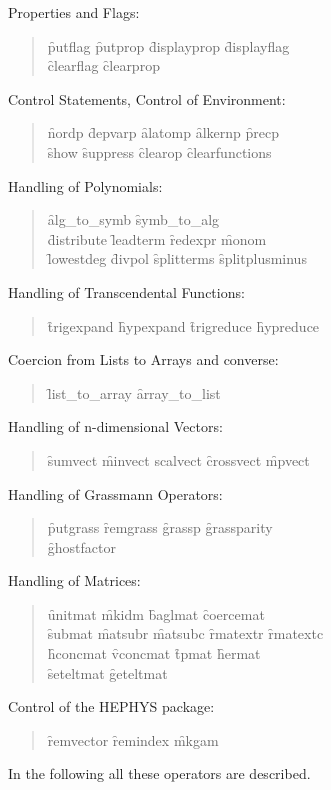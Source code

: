 \begin{itemize}
\item{Properties and Flags:}
\begin{quote}
\f{putflag} \f{putprop} \f{displayprop} \f{displayflag} \\
\f{clearflag} \f{clearprop} 
\end{quote}
\item{Control Statements, Control of Environment:}
\begin{quote}
\f{nordp} \f{depvarp} \f{alatomp} \f{alkernp} \f{precp} \\
\f{show} \f{suppress} \f{clearop} \f{clearfunctions}
\end{quote}
\item{Handling of Polynomials:}
\begin{quote}
\f{alg\_to\_symb} \f{symb\_to\_alg} \\
\f{distribute} \f{leadterm} \f{redexpr} \f{monom} \\
\f{lowestdeg} \f{divpol} \f{splitterms} \f{splitplusminus}
\end{quote}
\item{Handling of Transcendental Functions:}
\begin{quote}
\f{trigexpand} \f{hypexpand} \f{trigreduce} \f{hypreduce}
\end{quote}
\item{Coercion from Lists to Arrays and converse:}
\begin{quote}
\f{list\_to\_array} \f{array\_to\_list}
\end{quote}
\item{Handling of n-dimensional Vectors:}
\begin{quote}
\f{sumvect} \f{minvect scalvect} \f{crossvect} \f{mpvect}
\end{quote}
{\item Handling of Grassmann Operators:}
\begin{quote}
  \f{putgrass} \f{remgrass} \f{grassp} \f{grassparity}\\
  \f{ghostfactor}
\end{quote}
\item{Handling of Matrices:}
\begin{quote}
\f{unitmat} \f{mkidm} \f{baglmat} \f{coercemat} \\
\f{submat} \f{matsubr} \f{matsubc} \f{rmatextr} \f{rmatextc} \\
\f{hconcmat} \f{vconcmat} \f{tpmat} \f{hermat} \\
\f{seteltmat} \f{geteltmat}
\end{quote}
\item{Control of the HEPHYS package:}
\begin{quote}
\f{remvector} \f{remindex} \f{mkgam}
\end{quote}
\end{itemize}
In the following all these operators are described.
